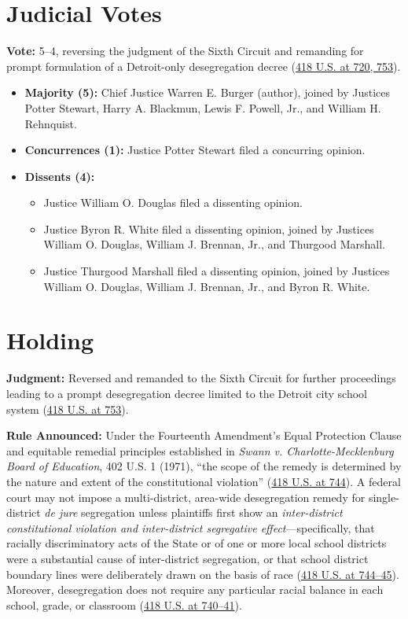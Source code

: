 \documentclass[12pt]{article}
\begin{document}
\section{Judicial Votes}
\textbf{Vote:} 5--4, reversing the judgment of the Sixth Circuit and remanding for prompt formulation of a Detroit-only desegregation decree (\href{https://supreme.justia.com/cases/federal/us/418/717/}{418 U.S. at 720, 753}).
\begin{itemize}
\item \textbf{Majority (5):} Chief Justice Warren E. Burger (author), joined by Justices Potter Stewart, Harry A. Blackmun, Lewis F. Powell, Jr., and William H. Rehnquist.
\item \textbf{Concurrences (1):} Justice Potter Stewart filed a concurring opinion.
\item \textbf{Dissents (4):}
\begin{itemize}
\item Justice William O. Douglas filed a dissenting opinion.
\item Justice Byron R. White filed a dissenting opinion, joined by Justices William O. Douglas, William J. Brennan, Jr., and Thurgood Marshall.
\item Justice Thurgood Marshall filed a dissenting opinion, joined by Justices William O. Douglas, William J. Brennan, Jr., and Byron R. White.
\end{itemize}
\end{itemize}

\section{Holding}
\textbf{Judgment:} Reversed and remanded to the Sixth Circuit for further proceedings leading to a prompt desegregation decree limited to the Detroit city school system (\href{https://supreme.justia.com/cases/federal/us/418/717/}{418 U.S. at 753}).

\textbf{Rule Announced:} Under the Fourteenth Amendment's Equal Protection Clause and equitable remedial principles established in \textit{Swann v. Charlotte-Mecklenburg Board of Education}, 402 U.S. 1 (1971), ``the scope of the remedy is determined by the nature and extent of the constitutional violation'' (\href{https://supreme.justia.com/cases/federal/us/418/717/}{418 U.S. at 744}). A federal court may not impose a multi-district, area-wide desegregation remedy for single-district \textit{de jure} segregation unless plaintiffs first show an \textit{inter-district constitutional violation and inter-district segregative effect}---specifically, that racially discriminatory acts of the State or of one or more local school districts were a substantial cause of inter-district segregation, or that school district boundary lines were deliberately drawn on the basis of race (\href{https://supreme.justia.com/cases/federal/us/418/717/}{418 U.S. at 744--45}). Moreover, desegregation does not require any particular racial balance in each school, grade, or classroom (\href{https://supreme.justia.com/cases/federal/us/418/717/}{418 U.S. at 740--41}).
\end{document}

